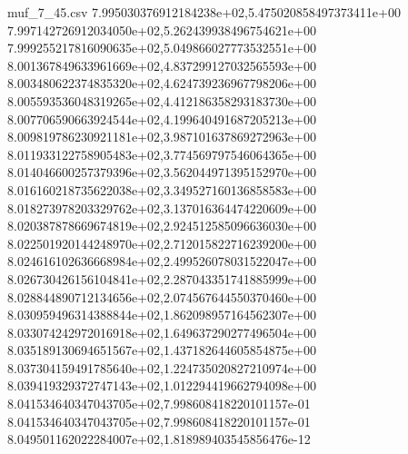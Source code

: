\begin{filecontents*}{muf_7_45.csv}
7.995030376912184238e+02,5.475020858497373411e+00
7.997142726912034050e+02,5.262439938496754621e+00
7.999255217816090635e+02,5.049866027773532551e+00
8.001367849633961669e+02,4.837299127032565593e+00
8.003480622374835320e+02,4.624739236967798206e+00
8.005593536048319265e+02,4.412186358293183730e+00
8.007706590663924544e+02,4.199640491687205213e+00
8.009819786230921181e+02,3.987101637869272963e+00
8.011933122758905483e+02,3.774569797546064365e+00
8.014046600257379396e+02,3.562044971395152970e+00
8.016160218735622038e+02,3.349527160136858583e+00
8.018273978203329762e+02,3.137016364474220609e+00
8.020387878669674819e+02,2.924512585096636030e+00
8.022501920144248970e+02,2.712015822716239200e+00
8.024616102636668984e+02,2.499526078031522047e+00
8.026730426156104841e+02,2.287043351741885999e+00
8.028844890712134656e+02,2.074567644550370460e+00
8.030959496314388844e+02,1.862098957164562307e+00
8.033074242972016918e+02,1.649637290277496504e+00
8.035189130694651567e+02,1.437182644605854875e+00
8.037304159491785640e+02,1.224735020827210974e+00
8.039419329372747143e+02,1.012294419662794098e+00
8.041534640347043705e+02,7.998608418220101157e-01
8.041534640347043705e+02,7.998608418220101157e-01
8.049501162022284007e+02,1.818989403545856476e-12
\end{filecontents*}

